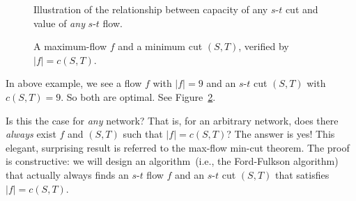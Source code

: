 \begin{figure}[t]
\centering{}
\caption{Illustration of the relationship between capacity of any $s$-$t$ cut
and value of \emph{any} $s$-$t$ flow.}
\label{fig:flow-meet}
\end{figure}


\begin{figure}[h]
\centering{}
\caption{A maximum-flow $f$ and a minimum cut $(S, T)$, verified by $|f| = c(S,T)$.}
\label{fig:maxflow-mincut}
\end{figure}

In above example, we see a flow $f$ with $|f| = 9$ and an $s$-$t$ cut $(S, T)$ with $c(S, T) = 9$.
So both are optimal. See Figure~\ref{fig:maxflow-mincut}.

Is this the case for \emph{any} network?
That is, for an arbitrary network,
does there \emph{always} exist $f$ and $(S,T)$ such that $|f| = c(S,T)$?
The answer is yes! This elegant, surprising result is referred to the max-flow min-cut theorem.
The proof is constructive: we will design an algorithm~(i.e., the Ford-Fulkson algorithm)
that actually always finds an $s$-$t$ flow $f$ and an $s$-$t$ cut $(S, T)$ that satisfies $|f| = c(S, T)$.

